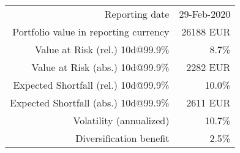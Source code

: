 \center
\label{table_port_var}
\begin{tabular}{r r}
\rowcolor{cblightblue}
Reporting date & 29-Feb-2020\\
Portfolio value in reporting currency &     26188 EUR\\
\rowcolor{cblightblue}
Value at Risk (rel.) 10d@99.9\% &       8.7\%\\
Value at Risk (abs.) 10d@99.9\% &      2282 EUR\\
\rowcolor{cblightblue}
Expected Shortfall (rel.) 10d@99.9\% &      10.0\%\\
Expected Shortfall (abs.) 10d@99.9\% &      2611 EUR\\
\rowcolor{cblightblue}
Volatility (annualized) & 10.7\%\\
Diversification benefit &       2.5\%\\ 
\end{tabular}
